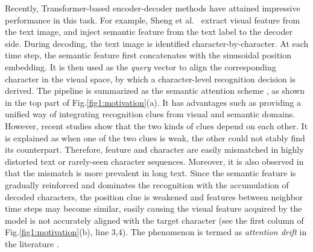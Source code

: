 Recently, Transformer-based encoder-decoder methods have attained impressive performance in this task. For example, Sheng et al.~\citep{sheng2019nrtr} extract visual feature from the text image, and inject semantic feature from the text label to the decoder side. During decoding, the text image is identified character-by-character. At each time step, the semantic feature first concatenates with the sinusoidal position embedding. It is then used as the \emph{query} vector to align the corresponding character in the visual space, by which a character-level recognition decision is derived. The pipeline is summarized as the semantic attention scheme \citep{sheng2019nrtr,Baekwhats_wrong_19ICCV,SEEDqiao2020seed,zheng2023tps++}, as shown in the top part of Fig.\ref{fig1:motivation}(a). It has advantages such as providing a unified way of integrating recognition clues from visual and semantic domains. However, recent studies \citep{wang2020DAN,yue2020robustscanner} show that the two kinds of clues depend on each other. It is explained as when one of the two clues is weak, the other could not stably find its counterpart. Therefore, feature and character are easily mismatched in highly distorted text or rarely-seen character sequences. Moreover, it is also observed in \citep{yue2020robustscanner} that the mismatch is more prevalent in long text. Since the semantic feature is gradually reinforced and dominates the recognition with the accumulation of decoded characters, the position clue is weakened and features between neighbor time steps may become similar, easily causing the visual feature acquired by the model is not accurately aligned with the target character (see the first column of Fig.\ref{fig1:motivation}(b), line 3,4). The phenomenon is termed as \emph{attention drift} in the literature \citep{cheng2017focusing_attention,liao2019two_dim_per,wan2020textscanner,wang2019scene}.   
